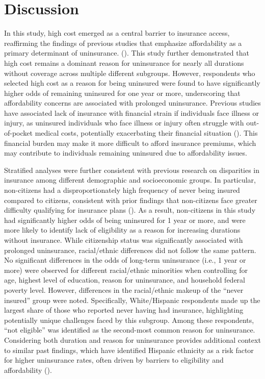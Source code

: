 \documentclass[12pt]{article}
\begin{document}
\section{Discussion}
In this study, high cost emerged as a central barrier to insurance access, reaffirming the findings of previous studies that emphasize affordability as a primary determinant of uninsurance. (\cite{cha_reasons_2020, tolbert_key_2024}). This study further demonstrated that high cost remains a dominant reason for uninsurance for nearly all durations without coverage across multiple different subgroups. However, respondents who selected high cost as a reason for being uninsured were found to have significantly higher odds of remaining uninsured for one year or more, underscoring that affordability concerns are associated with prolonged uninsurance. Previous studies have associated lack of insurance with financial strain if individuals face illness or injury, as uninsured individuals who face illness or injury often struggle with out-of-pocket medical costs, potentially exacerbating their financial situation (\cite{davis_uninsured_2007, tolbert_key_2024}). This financial burden may make it more difficult to afford insurance premiums, which may contribute to individuals remaining uninsured due to affordability issues.

Stratified analyses were further consistent with previous research on disparities in insurance among different demographic and socioeconomic groups. In particular, non-citizens had a disproportionately high frequency of never being insured compared to citizens, consistent with prior findings that non-citizens face greater difficulty qualifying for insurance plans (\cite{gunja_who_2019, wisk_inequalities_2019}). As a result, non-citizens in this study had significantly higher odds of being uninsured for 1 year or more, and were more likely to identify lack of eligibility as a reason for increasing durations without insurance. While citizenship status was significantly associated with prolonged uninsurance, racial/ethnic differences did not follow the same pattern. No significant differences in the odds of long-term uninsurance (i.e., 1 year or more) were observed for different racial/ethnic minorities when controlling for age, highest level of education, reason for uninsurance, and household federal poverty level. However, differences in the racial/ethnic makeup of the “never insured” group were noted. Specifically, White/Hispanic respondents made up the largest share of those who reported never having had insurance, highlighting potentially unique challenges faced by this subgroup. Among these respondents, “not eligible” was identified as the second-most common reason for uninsurance. Considering both duration and reason for uninsurance provides additional context to similar past findings, which have identified Hispanic ethnicity as a risk factor for higher uninsurance rates, often driven by barriers to eligibility and affordability (\cite{cha_reasons_2020, gunja_who_2019, lee_convergence_2021}). 
\end{document}
